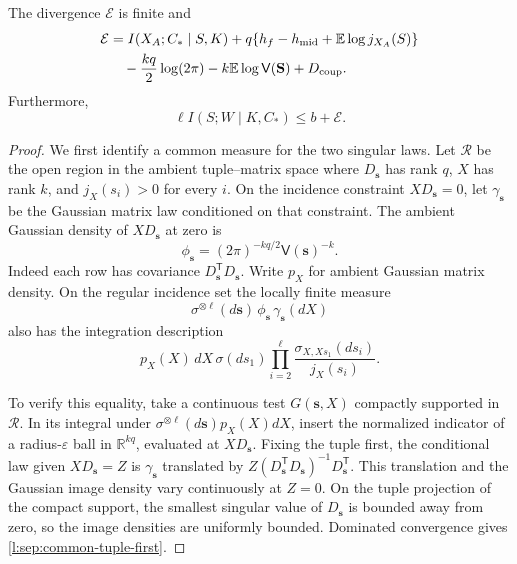 \begin{lemma}
\label{l:sep:comparison}
The divergence \(\mathcal E\) is finite and
\begin{align}
 \mathcal E
 &=I(X_A;C_*\mid S,K)
   +q\{h_f-h_{\mathrm{mid}}+\mathbb E\log j_{X_A}(S)\}
       \notag\\
 &\quad-\frac{kq}{2}\log(2\pi)
       -k\mathbb E\log\mathsf V(\mathbf S)+D_{\mathrm{coup}}.
 \label{l:sep:comparison-identity}
\end{align}
Furthermore,
\begin{equation}
 \ell I(S;W\mid K,C_*)\le b+\mathcal E.
 \label{l:sep:message-sharing}
\end{equation}
\end{lemma}
\begin{proof}
We first identify a common measure for the two singular laws.  Let
\(\mathcal R\) be the open region in the ambient tuple--matrix space
where \(D_{\mathbf s}\) has rank \(q\), \(X\) has rank \(k\), and
\(j_X(s_i)>0\) for every \(i\).  On the incidence constraint
\(XD_{\mathbf s}=0\), let \(\gamma_{\mathbf s}\) be the Gaussian
matrix law conditioned on that constraint.  The ambient Gaussian
density of \(XD_{\mathbf s}\) at zero is
\[
 \phi_{\mathbf s}=(2\pi)^{-kq/2}\mathsf V(\mathbf s)^{-k}.
\]
Indeed each row has covariance
\(D_{\mathbf s}^{\mathsf T}D_{\mathbf s}\).  Write \(p_X\) for
ambient Gaussian matrix density.  On the regular incidence set the
locally finite measure
\begin{equation}
 \sigma^{\otimes\ell}(d\mathbf s)\,
       \phi_{\mathbf s}\,\gamma_{\mathbf s}(dX)
 \label{l:sep:common-tuple-first}
\end{equation}
also has the integration description
\begin{equation}
 p_X(X)\,dX\,\sigma(ds_1)
       \prod_{i=2}^{\ell}
       \frac{\sigma_{X,Xs_1}(ds_i)}{j_X(s_i)}.
 \label{l:sep:common-matrix-first}
\end{equation}

To verify this equality, take a continuous test \(G(\mathbf s,X)\)
compactly supported in \(\mathcal R\).  In its integral under
\(\sigma^{\otimes\ell}(d\mathbf s)p_X(X)dX\), insert the normalized
indicator of a radius-\(\varepsilon\) ball in \(\mathbb R^{kq}\),
evaluated at \(XD_{\mathbf s}\).  Fixing the tuple first, the
conditional law given \(XD_{\mathbf s}=Z\) is
\(\gamma_{\mathbf s}\) translated by
\(Z(D_{\mathbf s}^{\mathsf T}D_{\mathbf s})^{-1}D_{\mathbf s}^{\mathsf T}\).
This translation and the Gaussian image density vary continuously
at \(Z=0\).  On the tuple projection of the compact support, the
smallest singular value of \(D_{\mathbf s}\) is bounded away from
zero, so the image densities are uniformly bounded.  Dominated
convergence gives \eqref{l:sep:common-tuple-first}.


\end{proof}
